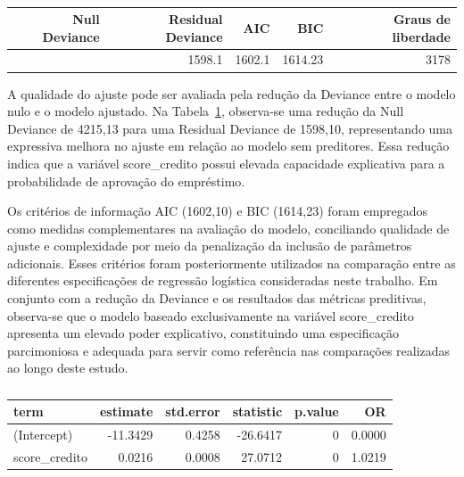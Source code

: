 \documentclass[
  brazilian,
  12pt,
  letterpaper,
  DIV=11,
  numbers=noendperiod]{scrartcl}
\begin{document}
{

\begin{longtable}[]{@{}rrrrr@{}}

\caption{\label{tbl-comp-metrics-default-2}}

\tabularnewline

\toprule\noalign{}
Null Deviance & Residual Deviance & AIC & BIC & Graus de liberdade \\
\midrule\noalign{}
\endhead
\bottomrule\noalign{}
\endlastfoot
4215.129 & 1598.1 & 1602.1 & 1614.23 & 3178 \\

\end{longtable}

}

A qualidade do ajuste pode ser avaliada pela redução da Deviance entre o
modelo nulo e o modelo ajustado. Na
Tabela~\ref{tbl-comp-metrics-default-2}, observa-se uma redução da Null
Deviance de 4215,13 para uma Residual Deviance de 1598,10, representando
uma expressiva melhora no ajuste em relação ao modelo sem preditores.
Essa redução indica que a variável score\_credito possui elevada
capacidade explicativa para a probabilidade de aprovação do empréstimo.

Os critérios de informação AIC (1602,10) e BIC (1614,23) foram
empregados como medidas complementares na avaliação do modelo,
conciliando qualidade de ajuste e complexidade por meio da penalização
da inclusão de parâmetros adicionais. Esses critérios foram
posteriormente utilizados na comparação entre as diferentes
especificações de regressão logística consideradas neste trabalho. Em
conjunto com a redução da Deviance e os resultados das métricas
preditivas, observa-se que o modelo baseado exclusivamente na variável
score\_credito apresenta um elevado poder explicativo, constituindo uma
especificação parcimoniosa e adequada para servir como referência nas
comparações realizadas ao longo deste estudo.

{

\begin{longtable}[]{@{}lrrrrr@{}}

\caption{\label{tbl-complete-model-default-2}}

\tabularnewline

\toprule\noalign{}
term & estimate & std.error & statistic & p.value & OR \\
\midrule\noalign{}
\endhead
\bottomrule\noalign{}
\endlastfoot
(Intercept) & -11.3429 & 0.4258 & -26.6417 & 0 & 0.0000 \\
score\_credito & 0.0216 & 0.0008 & 27.0712 & 0 & 1.0219 \\

\end{longtable}

}
\end{document}
